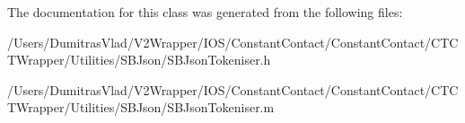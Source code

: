 The documentation for this class was generated from the following files\-:\begin{DoxyCompactItemize}
\item 
/\-Users/\-Dumitras\-Vlad/\-V2\-Wrapper/\-I\-O\-S/\-Constant\-Contact/\-Constant\-Contact/\-C\-T\-C\-T\-Wrapper/\-Utilities/\-S\-B\-Json/S\-B\-Json\-Tokeniser.\-h\item 
/\-Users/\-Dumitras\-Vlad/\-V2\-Wrapper/\-I\-O\-S/\-Constant\-Contact/\-Constant\-Contact/\-C\-T\-C\-T\-Wrapper/\-Utilities/\-S\-B\-Json/S\-B\-Json\-Tokeniser.\-m\end{DoxyCompactItemize}
